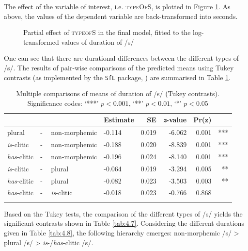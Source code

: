 The effect of the variable of interest, i.e. \textsc{typeOfS}, is plotted in Figure \ref{fig:4_6}. As above, the values of the dependent variable are back-transformed into seconds.

\begin{figure}
    \centering
    
    \caption{Partial effect of \textsc{typeofS} in the final model, fitted to the log-transformed values of duration of /s/}
    \label{fig:4_6}
\end{figure}

One can see that there are durational differences between the different types of /s/. The results of pair-wise comparisons of the predicted means using Tukey contrasts (as implemented by the \texttt{SfL} package, \cite{Schmitz2021sfl}) are summarised in Table \ref{tab:4.6}.

\begin{table}\fontsize{10}{11}
\caption{Multiple comparisons of means of duration of /s/ (Tukey contrasts). Significance codes: `***' $p < 0.001$, `**' $p < 0.01$, `*' $p < 0.05$}
\label{tab:4.6}
\centering
\begin{tabular}{llllrrrr} 
\lsptoprule
~                   & ~ & ~                  & Estimate & SE    & \textit{z}-value & Pr(\textbar{}z\textbar{}) & ~    \\ 
\midrule
plural              & - & non-morphemic      & -0.114   & 0.019 & -6.062           & 
  0.001                  & ***  \\
\textit{is}-clitic  & - & non-morphemic      & -0.188   & 0.020 & -8.839           &  0.001                    & ***  \\
\textit{has}-clitic & - & non-morphemic      & -0.196   & 0.024 & -8.140           & 
  0.001                  & ***  \\
\textit{is}-clitic  & - & plural             & -0.064   & 0.019 & -3.294           & 0.005                     & **   \\
\textit{has}-clitic & - & plural             & -0.082   & 0.023 & -3.503           & 0.003                     & **   \\
\textit{has}-clitic & - & \textit{is}-clitic & -0.018   & 0.023 & -0.766           & 0.868                     & ~    \\
\lspbottomrule
\end{tabular}
\end{table}

Based on the Tukey tests, the comparison of the different types of /s/ yields the significant contrasts shown in Table \ref{tab:4.7}. Considering the different durations given in Table \ref{tab:4.8}, the following hierarchy emerges: non-morphemic /s/ > plural /s/ > \textit{is}-/\textit{has}-clitic /s/.

